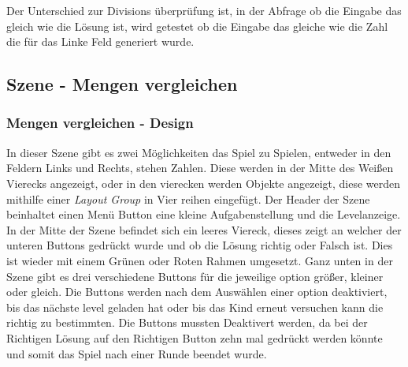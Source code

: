 Der Unterschied zur Divisions überprüfung ist, in der Abfrage ob die Eingabe das gleich wie die Lösung ist, wird getestet ob die Eingabe das gleiche wie die Zahl die für das Linke Feld generiert wurde.
\subsection{Szene - Mengen vergleichen}
\subsubsection{Mengen vergleichen - Design}
In dieser Szene gibt es zwei Möglichkeiten das Spiel zu Spielen, entweder in den Feldern Links und Rechts, stehen Zahlen. Diese werden in der Mitte des Weißen Vierecks angezeigt, oder in den vierecken werden Objekte angezeigt, diese werden mithilfe einer \textit{Layout Group} in Vier reihen eingefügt. Der Header der Szene beinhaltet einen Menü Button eine kleine Aufgabenstellung und die Levelanzeige. In der Mitte der Szene befindet sich ein leeres Viereck, dieses zeigt an welcher der unteren Buttons gedrückt wurde und ob die Lösung richtig oder Falsch ist. Dies ist wieder mit einem Grünen oder Roten Rahmen umgesetzt. Ganz unten in der Szene gibt es drei verschiedene Buttons für die jeweilige option größer, kleiner oder gleich. Die Buttons werden nach dem Auswählen einer option deaktiviert, bis das nächste level geladen hat oder bis das Kind erneut versuchen kann die richtig zu bestimmten. Die Buttons mussten Deaktivert werden, da bei der Richtigen Lösung auf den Richtigen Button zehn mal gedrückt werden könnte und somit das Spiel nach einer Runde beendet wurde.\\
